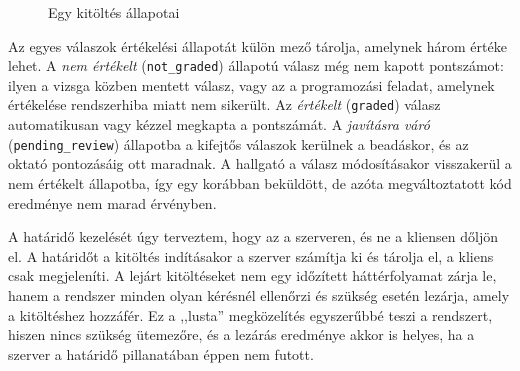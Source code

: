 \begin{figure}[H]
  \centering
  \caption{Egy kitöltés állapotai}
  \label{fig:allapotok}
\end{figure}

Az egyes válaszok értékelési állapotát külön mező tárolja, amelynek három értéke lehet.
A \textit{nem értékelt} (\texttt{not\_graded}) állapotú válasz még nem kapott pontszámot: ilyen a
vizsga közben mentett válasz, vagy az a programozási feladat, amelynek értékelése rendszerhiba
miatt nem sikerült. Az \textit{értékelt} (\texttt{graded}) válasz automatikusan vagy kézzel
megkapta a pontszámát. A \textit{javításra váró} (\texttt{pending\_review}) állapotba a kifejtős
válaszok kerülnek a beadáskor, és az oktató pontozásáig ott maradnak. A hallgató a válasz
módosításakor visszakerül a nem értékelt állapotba, így egy korábban beküldött, de azóta
megváltoztatott kód eredménye nem marad érvényben.

A határidő kezelését úgy terveztem, hogy az a szerveren, és ne a kliensen dőljön el. A
határidőt a kitöltés indításakor a szerver számítja ki és tárolja el, a kliens csak megjeleníti.
A lejárt kitöltéseket nem egy időzített háttérfolyamat zárja le, hanem a rendszer minden olyan
kérésnél ellenőrzi és szükség esetén lezárja, amely a kitöltéshez hozzáfér. Ez a ,,lusta''
megközelítés egyszerűbbé teszi a rendszert, hiszen nincs szükség ütemezőre, és a lezárás
eredménye akkor is helyes, ha a szerver a határidő pillanatában éppen nem futott.

